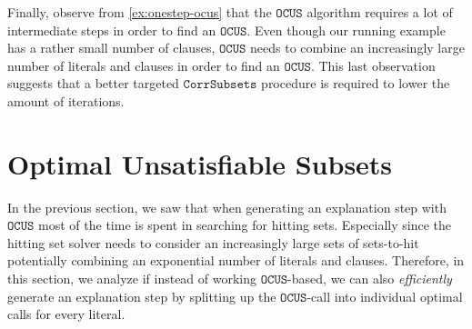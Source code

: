 \documentclass[a4paper,UKenglish,cleveref, autoref, thm-restate, pdfa]{lipics-v2021}
\newcommand\m[1]{\mathcal{#1}}
\renewcommand\comment[1]{}
\newcommand{\emilio}[1]{{\comment{\color{red}Emilio: #1}}}
\newcommand{\bart}[1]{{\comment{\color{OliveGreen}Bart: #1}}}
\newcommand\mm[1]{\ensuremath{#1}\xspace}
\newcommand\call[1]{\mm{\texttt{#1}}}
\newcommand\omus{\mm{\call{OUS}}}
\newcommand\comus{\mm{\call{OCUS}}}
\newcommand\corrsubsets{\mm{\call{CorrSubsets}}}
\begin{document}
%	
%	
Finally, observe from \cref{ex:onestep-ocus} that the \comus algorithm requires a lot of intermediate steps in order to find an \comus. Even though our running example has a rather small number of clauses, \comus needs to combine an increasingly large number of literals and clauses in order to find an \comus. 
This last observation suggests that a better targeted \corrsubsets procedure is required to lower the amount of iterations.   
\emilio{Maybe should be moved to example env. I thought putting it here would be an interesting conclusion for this section.}

\section{Optimal Unsatisfiable Subsets\emilio{Adapt title to fit narrative OCUS call with p set to true}}\label{sec:OUS}

In the previous section, we saw that when generating an explanation step with \comus most of the time is spent in searching for hitting sets. 
Especially since the hitting set solver needs to consider an increasingly large sets of sets-to-hit potentially combining an exponential number of literals and clauses.
Therefore, in this section, we analyze if instead of working \comus-based, we can also \emph{efficiently} generate an explanation step by splitting up the \comus-call into individual optimal calls for every literal.
\end{document}
